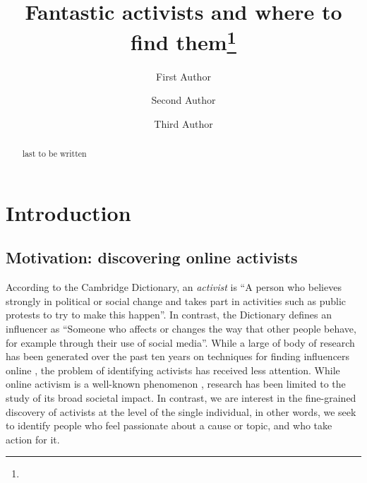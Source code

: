 \documentclass[runningheads]{llncs}
\begin{document}
%
\title{Fantastic activists and where to find them\thanks{}}
%
%
\author{First Author \and
Second Author \and
Third Author}
%
%
%
\maketitle              %
%
\begin{abstract}
last to be written
\end{abstract}
%


%
%
\section{Introduction}


\subsection{Motivation: discovering online activists}

According to the Cambridge Dictionary, an \textit{activist} is  ``A person who believes strongly in political or social change and takes part in activities such as public protests to try to make this happen''.
In contrast, the Dictionary defines an influencer as ``Someone who affects or changes the way that other people behave, for example through their use of social media''.
%
While a large of body of research has been generated over the past ten years on techniques for finding influencers online \cite{RIQUELME2016949}, the problem of identifying activists has received less attention. 
While online activism is a well-known phenomenon \cite{IJoC1246}, research has been limited to the study of its broad societal impact. 
In contrast, we are interest in the fine-grained discovery of activists at the level of the single individual, in other words, we seek to identify people who feel passionate about a cause or topic, and who take action for it.
\end{document}
